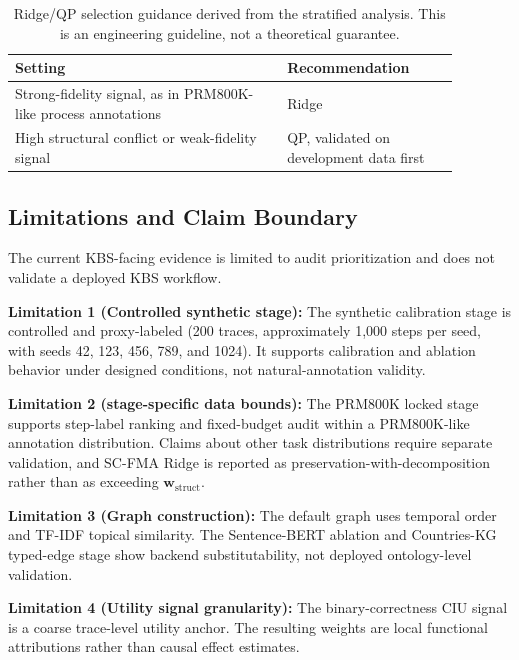 \documentclass[a4paper,fleqn]{cas-sc}
\newcommand{\wstruct}{\ensuremath{\mathbf{w}_{\mathrm{struct}}}}
\begin{document}
\begin{table}[ht]
\caption{Ridge/QP selection guidance derived from the stratified analysis. This is an engineering guideline, not a theoretical guarantee.}
\label{tab:variant-policy}
\centering
\small
\renewcommand{\arraystretch}{1.08}
\begin{tabular}{p{0.54\linewidth}p{0.34\linewidth}}
\toprule
\textbf{Setting} & \textbf{Recommendation} \\
\midrule
Strong-fidelity signal, as in PRM800K-like process annotations & Ridge \\
High structural conflict or weak-fidelity signal & QP, validated on development data first \\
\bottomrule
\end{tabular}
\end{table}

\subsection{Limitations and Claim Boundary}
\label{sec:claim-boundary}

\medskip
\noindent The current KBS-facing evidence is limited to audit prioritization and does not validate a deployed KBS workflow.

\medskip
\noindent\textbf{Limitation 1 (Controlled synthetic stage):} The synthetic calibration stage is controlled and proxy-labeled (200 traces, approximately 1,000 steps per seed, with seeds 42, 123, 456, 789, and 1024). It supports calibration and ablation behavior under designed conditions, not natural-annotation validity.

\textbf{Limitation 2 (stage-specific data bounds):} The PRM800K locked stage supports step-label ranking and fixed-budget audit within a PRM800K-like annotation distribution. Claims about other task distributions require separate validation, and SC-FMA Ridge is reported as preservation-with-decomposition rather than as exceeding \wstruct{}.

\textbf{Limitation 3 (Graph construction):} The default graph uses temporal order and TF-IDF topical similarity. The Sentence-BERT ablation and Countries-KG typed-edge stage show backend substitutability, not deployed ontology-level validation.

\textbf{Limitation 4 (Utility signal granularity):} The binary-correctness CIU signal is a coarse trace-level utility anchor. The resulting weights are local functional attributions rather than causal effect estimates.
\end{document}
